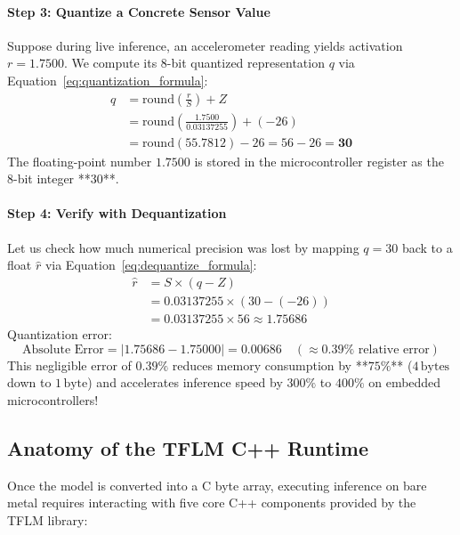\begin{example}
\paragraph{Step 3: Quantize a Concrete Sensor Value}
Suppose during live inference, an accelerometer reading yields activation $r = 1.7500$. 
We compute its 8-bit quantized representation $q$ via Equation~\eqref{eq:quantization_formula}:
\begin{align*}
q &= \text{round}\left( \frac{r}{S} \right) + Z\\
  &= \text{round}\left( \frac{1.7500}{0.03137255} \right) + (-26)\\
  &= \text{round}(55.7812) - 26 = 56 - 26 = \mathbf{30}
\end{align*}
The floating-point number $1.7500$ is stored in the microcontroller register as the 8-bit integer **$30$**.

\paragraph{Step 4: Verify with Dequantization}
Let us check how much numerical precision was lost by mapping $q = 30$ back to a float $\hat{r}$ via Equation~\eqref{eq:dequantize_formula}:
\begin{align*}
\hat{r} &= S \times (q - Z)\\
        &= 0.03137255 \times (30 - (-26))\\
        &= 0.03137255 \times 56 \approx \mathbf{1.75686}
\end{align*}
Quantization error:
\begin{equation*}
\text{Absolute Error} = |1.75686 - 1.75000| = 0.00686 \quad (\approx 0.39\% \text{ relative error})
\end{equation*}
This negligible error of $0.39\%$ reduces memory consumption by **$75\%$** ($4\,\text{bytes}$ down to $1\,\text{byte}$) and accelerates inference speed by $300\%$ to $400\%$ on embedded microcontrollers!
\end{example}

\subsection{Anatomy of the TFLM C++ Runtime}\label{subsec:tflm_runtime}

Once the model is converted into a C byte array, executing inference on bare metal requires interacting with five core C++ components provided by the TFLM library:

